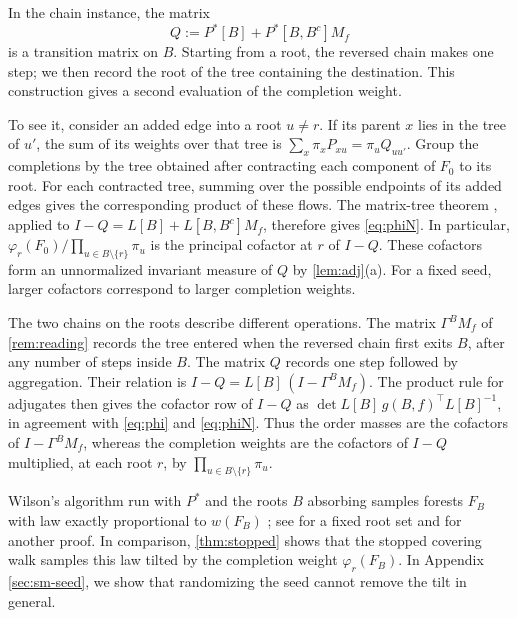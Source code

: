 \documentclass[onefignum,onetabnum,nohypdvips]{siamart250211}
\numberwithin{theorem}{section}
\numberwithin{equation}{section}
\begin{document}
\begin{remark}\label{rem:contract}
In the chain instance, the matrix
\[
Q:=P^{*}[B]+P^{*}[B,B^c]M_f
\]
is a transition matrix on $B$. Starting from a root, the reversed
chain makes one step; we then record the root of the tree containing
the destination. This construction gives a second evaluation of the
completion weight.

To see it, consider an added edge into a root $u\ne r$. If its parent
$x$ lies in the tree of $u'$, the sum of its weights over that tree is
$\sum_x\pi_xP_{xu}=\pi_uQ_{uu'}$. Group the completions by the tree
obtained after contracting each component of $F_0$ to its root.
For each contracted tree, summing over the possible endpoints of its
added edges gives the corresponding product of these flows. The
matrix-tree theorem \cite{Tutte1948,Chaiken1982}, applied to
$I-Q=L[B]+L[B,B^c]M_f$, therefore gives \eqref{eq:phiN}.
In particular,
$\varphi_r(F_0)/\prod_{u\in B\setminus\{r\}}\pi_u$ is the principal
cofactor at $r$ of $I-Q$. These cofactors form an unnormalized
invariant measure of $Q$ by \cref{lem:adj}(a). For a fixed seed, larger
cofactors correspond to larger completion weights.

The two chains on the roots describe different operations.
The matrix $\Gamma^BM_f$ of \cref{rem:reading} records the tree
entered when the reversed chain first exits $B$, after any number of
steps inside $B$. The matrix $Q$ records one step followed by
aggregation. Their relation is
$I-Q=L[B]\,(I-\Gamma^BM_f)$. The product rule for adjugates then gives
the cofactor row of $I-Q$ as
$\det L[B]\,g(B,f)^{\top}L[B]^{-1}$, in agreement with
\eqref{eq:phi} and \eqref{eq:phiN}. Thus the order masses are the
cofactors of $I-\Gamma^BM_f$, whereas the completion weights are the
cofactors of $I-Q$ multiplied, at each root $r$, by
$\prod_{u\in B\setminus\{r\}}\pi_u$.

\end{remark}



\begin{remark}\label{rem:wilson}
Wilson's algorithm run with $P^{*}$ and the roots $B$ absorbing samples
forests $F_B$ with law exactly proportional to $w(F_B)$
\cite{Wilson1996,ProppWilson1998}; see
\cite[Cor.~2.3]{AvenaGaudilliere2018forests} for a fixed root set and
\cite{Marchal2000} for another proof. In
comparison, \cref{thm:stopped} shows that the stopped covering walk
samples this law tilted by the completion weight $\varphi_r(F_B)$. In
Appendix \ref{sec:sm-seed}, we show that randomizing the seed cannot remove the
tilt in general.
\end{remark}
\end{document}
